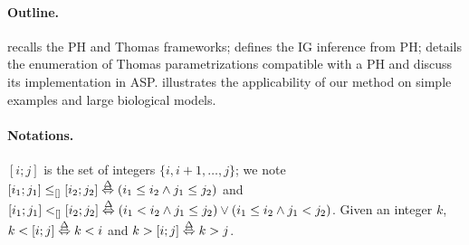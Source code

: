\paragraph{Outline.}
 recalls the PH and Thomas frameworks;
 defines the IG inference from PH;
 details the enumeration of Thomas parametrizations compatible with a PH
and discuss its implementation in ASP.
 illustrates the applicability of our method on simple examples
and large biological models.

\paragraph{Notations.}
$[i;j]$ is the set of integers $\{ i, i+1, \dots, j \}$;
we note $[i_1;j_1] \leq_{[]} [i_2;j_2] \stackrel{\Delta}\Leftrightarrow (i_1\leq i_2\wedge j_1\leq j_2)$
and $[i_1;j_1] <_{[]} [i_2;j_2] \stackrel{\Delta}\Leftrightarrow 
(i_1<i_2 \wedge j_1\leq j_2) \vee (i_1\leq i_2\wedge j_1 < j_2)$.
Given an integer $k$, $k<[i;j] \stackrel{\Delta}\Leftrightarrow k <i$ and $k>[i;j]\stackrel{\Delta}\Leftrightarrow k > j$.
